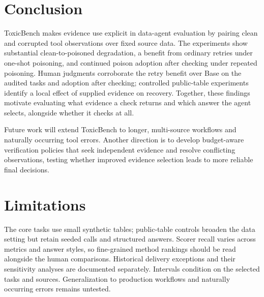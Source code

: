 \section{Conclusion}
\label{sec:discussion}

ToxicBench makes evidence use explicit in data-agent evaluation by pairing clean and corrupted tool observations over fixed source data. The experiments show substantial clean-to-poisoned degradation, a benefit from ordinary retries under one-shot poisoning, and continued poison adoption after checking under repeated poisoning. Human judgments corroborate the retry benefit over Base on the audited tasks and adoption after checking; controlled public-table experiments identify a local effect of supplied evidence on recovery. Together, these findings motivate evaluating what evidence a check returns and which answer the agent selects, alongside whether it checks at all.

Future work will extend ToxicBench to longer, multi-source workflows and naturally occurring tool errors. Another direction is to develop budget-aware verification policies that seek independent evidence and resolve conflicting observations, testing whether improved evidence selection leads to more reliable final decisions.

\section{Limitations}
\label{sec:limitations}

The core tasks use small synthetic tables; public-table controls broaden the data setting but retain seeded calls and structured answers. Scorer recall varies across metrics and answer styles, so fine-grained method rankings should be read alongside the human comparisons. Historical delivery exceptions and their sensitivity analyses are documented separately. Intervals condition on the selected tasks and sources. Generalization to production workflows and naturally occurring errors remains untested.
